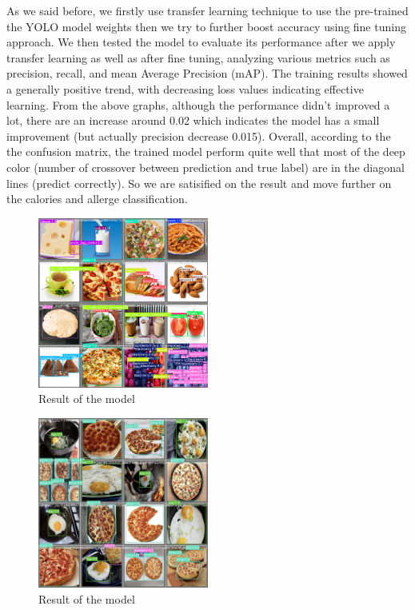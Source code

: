 \documentclass[10pt,twocolumn,letterpaper]{article}
\begin{document}
As we said before, we firstly use transfer learning technique to use the pre-trained the YOLO model weights then we try to further boost accuracy using fine tuning approach. 
We then tested the model to evaluate its performance after we apply transfer learning as well as after fine tuning, analyzing various metrics such as precision, recall, and mean Average Precision (mAP). 
The training results showed a generally positive trend, with decreasing loss values indicating effective learning. 
From the above graphs, although the performance didn't improved a lot, there are an increase around 0.02 which indicates the model has a small improvement (but actually precision decrease 0.015). 
Overall, according to the the confusion matrix, the trained model perform quite well that most of the deep color (number of crossover between prediction and true label) are in the diagonal lines (predict correctly). 
So we are satisified on the result and move further on the calories and allerge classification.
\begin{figure}[htbp]
    \centering
    \includegraphics[width=0.5\textwidth]{result.png}
    \caption{Result of the model}
\end{figure}
\begin{figure}[htbp]
    \centering
    \includegraphics[width=0.5\textwidth]{result2.png}
    \caption{Result of the model}
\end{figure}
\end{document}
